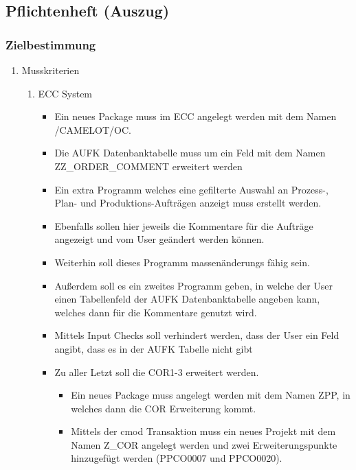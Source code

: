 \subsection{Pflichtenheft (Auszug)}
\label{app:Pflichtenheft}

\subsubsection*{Zielbestimmung}

\begin{enumerate}[itemsep=0em,partopsep=0em,parsep=0em,topsep=0em]
\item Musskriterien %
	\begin{enumerate}
	\item ECC System
		\begin{itemize}
		\item Ein neues Package muss im ECC angelegt werden mit dem Namen /CAMELOT/OC.
		\item Die AUFK Datenbanktabelle muss um ein Feld mit dem Namen ZZ\_ORDER\_COMMENT erweitert werden
		\item Ein extra Programm welches eine gefilterte Auswahl an Prozess-, Plan- und Produktions-Aufträgen anzeigt muss erstellt werden.
		\item Ebenfalls sollen hier jeweils die Kommentare für die Aufträge angezeigt und vom User geändert werden können. 
		\item Weiterhin soll dieses Programm massenänderungs fähig sein. 
		\item Außerdem soll es ein zweites Programm geben, in welche der User einen Tabellenfeld der AUFK Datenbanktabelle angeben kann, welches dann für die Kommentare genutzt wird.
		\item Mittels Input Checks soll verhindert werden, dass der User ein Feld angibt, dass es in der AUFK Tabelle nicht gibt
		\item Zu aller Letzt soll die COR1-3 erweitert werden.
		\begin{itemize}
			\item Ein neues Package muss angelegt werden mit dem Namen ZPP, in welches dann die COR Erweiterung kommt.
			\item Mittels der cmod Transaktion muss ein neues Projekt mit dem Namen Z\_COR angelegt werden und zwei Erweiterungspunkte hinzugefügt werden (PPCO0007 und PPCO0020).
		\end{itemize}
		\end{itemize} 

\end{enumerate}
\end{enumerate}
